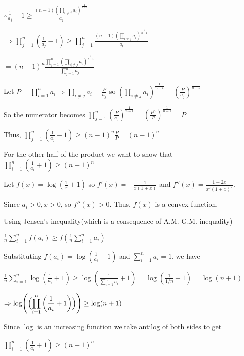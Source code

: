   $\therefore \frac{1}{a_j} - 1\geq \frac{(n - 1)\left(\prod_{i\neq j}a_i\right)^{\frac{1}{n - 1}}}{a_j}$

  $\Rightarrow \displaystyle\prod_{j = 1}^n\left(\frac{1}{a_j} - 1\right)\geq \prod_{j = 1}^n\frac{(n -
    1)\left(\prod_{i\neq j}a_i\right)^{\frac{1}{n - 1}}}{a_j}$

  $= (n - 1)^n\displaystyle\frac{\prod_{j = 1}^n\left(\prod_{i]\neq j}a_i\right)^{\frac{1}{n -
      1}}}{\prod_{j= 1}^na_j}$

  Let $P = \displaystyle\prod_{i = 1}^na_i\Rightarrow \prod_{i\neq j}a_i = \frac{P}{a_j}$ so
  $\left(\displaystyle\prod_{i\neq j}a_i\right)^{\frac{1}{n - 1}} = \left(\frac{P}{a_j}\right)^{\frac{1}{n -
      1}}$

  So the numerator becomes $\displaystyle\prod_{j = 1}^n\left(\frac{P}{a_j}\right)^{\frac{1}{n - 1}} =
  \left(\frac{P^n}{P}\right)^{\frac{1}{n - 1}} = P$

  Thus, $\displaystyle\prod_{j = 1}^n\left(\frac{1}{a_j} - 1\right)\geq (n - 1)^n\frac{P}{P} = (n - 1)^n$

  For the other half of the product we want to show that $\displaystyle\prod_{i = 1}^n\left(\frac{1}{a_i} +
  1\right)\geq (n + 1)^n$

  Let $f(x) = \log(\frac{1}{x} + 1)$ so $f'(x) = -\frac{1}{x(1 + x)}$ and $f''(x) = \frac{1 + 2x}{x^2(1 +
    x)^2}$.

  Since $a_i > 0, x > 0$, so $f''(x) > 0$. Thus, $f(x)$ is a convex function.

  Using Jensen's inequality(which is a consequence of A.M.-G.M. inequality)

  $\displaystyle\frac{1}{n}\sum_{i = 1}^nf(a_i)\geq f\left(\frac{1}{n}\sum_{i = 1}^na_i\right)$

  Substituting $f(a_i) = \displaystyle\log\left(\frac{1}{a_i} + 1\right)$ and $\displaystyle\sum_{i =
    1}^na_i = 1$, we have

  $\displaystyle\frac{1}{n}\sum_{i = 1}^n\log\left(\frac{1}{a_i} + 1\right)\geq \log\left(\frac{1}{\sum_{i =
      1}^na_i} + 1\right) = \log\left(\frac{1}{1/n} + 1\right) = \log(n + 1)$

  $\Rightarrow \displaystyle\log\Biggl(\Bigl(\prod_{i = 1}^n\left(\frac{1}{a_i} +
  1\right)\Bigr)\Biggr)\geq \log(n + 1)$

  Since $\log$ is an increasing function we take antilog of both sides to get

  $\displaystyle\prod_{i = 1}^n\left(\frac{1}{a_i} + 1\right)\geq (n + 1)^n$

